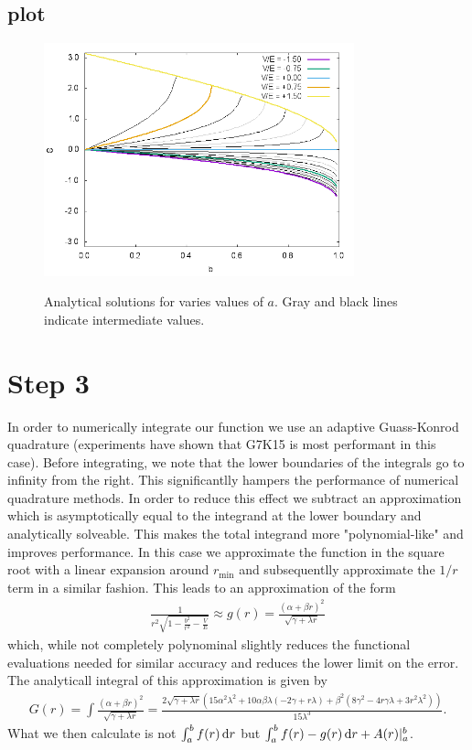 \subsection{plot}

\begin{figure}
  \centering
  \includegraphics[width=0.8\textwidth]{./plots/01_02}
  \label{fig:analytical}
  \caption{Analytical solutions for varies values of $a$. Gray and black lines indicate intermediate values.}
\end{figure}

\section{Step 3}
In order to numerically integrate our function we use an adaptive Guass-Konrod quadrature (experiments have shown that G7K15 is most performant in this case).
Before integrating, we note that the lower boundaries of the integrals go to infinity from the right. This significantlly hampers the performance of numerical
quadrature methods. In order to reduce this effect we subtract an approximation which is asymptotically equal to the integrand at the lower boundary and analytically solveable.
This makes the total integrand more "polynomial-like" and improves performance. In this case we approximate the function in the square root with a linear expansion around $r_\text{min}$ and
subsequentlly approximate the $1/r$ term in a similar fashion. This leads to an approximation of the form
\begin{align}
  \frac{1}{r^2\sqrt{1-\frac{b^2}{r^2}-\frac{V}{E}}} \approx g(r) = \frac{\left(\alpha+\beta r\right)^2}{\sqrt{\gamma+\lambda r}}
\end{align}
which, while not completely polynominal slightly reduces the functional evaluations needed for similar accuracy and reduces the lower limit on the error. The analyticall integral of this approximation is given by
\begin{align}
  G(r) = \int \frac{\left(\alpha+\beta r\right)^2}{\sqrt{\gamma+\lambda r}} = \frac{2\sqrt{\gamma+\lambda r}\left(15\alpha^2\lambda^2+10\alpha\beta\lambda\left(-2\gamma+r\lambda\right)+\beta^2\left(8\gamma^2-4r\gamma\lambda+3r^2\lambda^2\right)\right)}{15\lambda^3}.
\end{align}
What we then calculate is not $\int_a^bf(r) \,\text{d}r$ but $\int_a^b f(r)-g(r) \,\text{d}r + A(r)|_a^b$.

